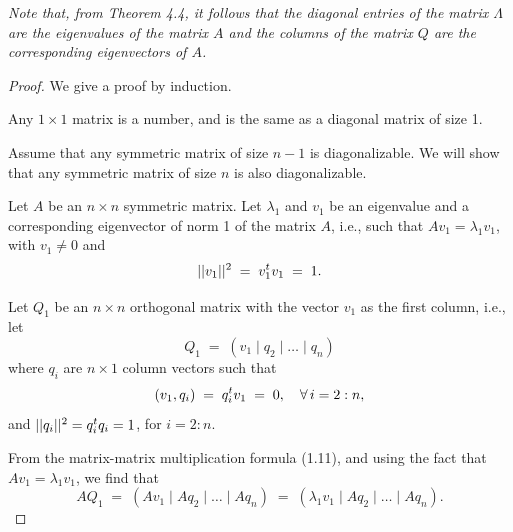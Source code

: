 \textit{Note that, from Theorem 4.4, it follows that the diagonal entries of the
matrix $\Lambda$ are the eigenvalues of the matrix $A$ and the columns of the matrix
$Q$ are the corresponding eigenvectors of $A$.}

\begin{proof}
We give a proof by induction.

Any $1 \times 1$ matrix is a number, and is the same as a diagonal matrix of size 1.

Assume that any symmetric matrix of size $n - 1$ is diagonalizable. We will show
that any symmetric matrix of size $n$ is also diagonalizable.

Let $A$ be an $n \times n$ symmetric matrix. Let $\lambda_1$ and $v_1$ be an
eigenvalue and a corresponding eigenvector of norm 1 of the matrix $A$, i.e., such
that $Av_1 = \lambda_1v_1$, with $v_1 \neq 0$ and
\begin{equation}
||v_1||^2 \;=\; v_1^{t} v_1 \;=\; 1.
\end{equation}

Let $Q_1$ be an $n \times n$ orthogonal matrix with the vector $v_1$ as the first
column, i.e., let
\[
Q_1 \;=\; (v_1 \mid q_2 \mid \dots \mid q_n)
\]
where $q_i$ are $n \times 1$ column vectors such that
\begin{equation}
(v_1,q_i) \;=\; q_i^{t} v_1 \;=\; 0, \quad \forall\, i = 2:n,
\end{equation}
and $||q_i||^2 = q_i^{t} q_i = 1$, for $i = 2:n$.

From the matrix-matrix multiplication formula (1.11), and using the fact that
$Av_1 = \lambda_1v_1$, we find that
\[
AQ_1 \;=\; (Av_1 \mid Aq_2 \mid \dots \mid Aq_n) \;=\; (\lambda_1v_1 \mid Aq_2 \mid
\dots \mid Aq_n).
\]


\end{proof}
